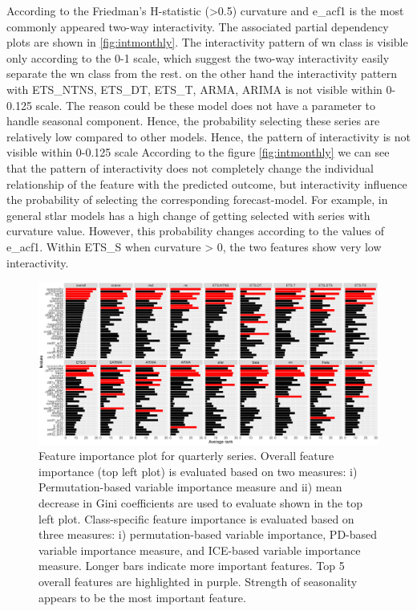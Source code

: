 \documentclass[11pt,a4paper,]{article}
\begin{document}
According to the Friedman's H-statistic (\textgreater{}0.5) curvature and e\_acf1 is the most commonly appeared two-way interactivity. The associated partial dependency plots are shown in \autoref{fig:intmonthly}. The interactivity pattern of wn class is visible only according to the 0-1 scale, which suggest the two-way interactivity easily separate the wn class from the rest. on the other hand the interactivity pattern with ETS\_NTNS, ETS\_DT, ETS\_T, ARMA, ARIMA is not visible within 0-0.125 scale. The reason could be these model does not have a parameter to handle seasonal component. Hence, the probability selecting these series are relatively low compared to other models. Hence, the pattern of interactivity is not visible within 0-0.125 scale According to the figure \autoref{fig:intmonthly} we can see that the pattern of interactivity does not completely change the individual relationship of the feature with the predicted outcome, but interactivity influence the probability of selecting the corresponding forecast-model. For example, in general stlar models has a high change of getting selected with series with curvature value. However, this probability changes according to the values of e\_acf1. Within ETS\_S when curvature \textgreater{} 0, the two features show very low interactivity.

\begin{figure}
\centering
\includegraphics{figures/viquarterly-1.pdf}
\caption{\label{fig:viquarterly}Feature importance plot for quarterly series. Overall feature importance (top left plot) is evaluated based on two measures: i) Permutation-based variable importance measure and ii) mean decrease in Gini coefficients are used to evaluate shown in the top left plot. Class-specific feature importance is evaluated based on three measures: i) permutation-based variable importance, PD-based variable importance measure, and ICE-based variable importance measure. Longer bars indicate more important features. Top 5 overall features are highlighted in purple. Strength of seasonality appears to be the most important feature.}
\end{figure}
\end{document}
